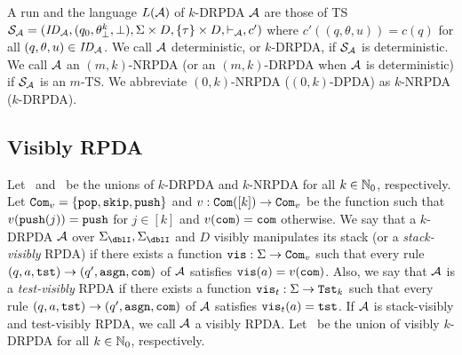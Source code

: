 A run and the language $L({\cal A})$ of $k$-DRPDA ${\cal A}$ are those of TS
${\cal S}_{\cal A}=(\mathit{ID}_{\cal A}, (q_0, \theta^k_\bot, \bot), \Sigma\times D, \{\tau\}\times D, \vdash_{\cal A}, c')$ where
$c'((q,\theta,u))=c(q)$ for all $(q,\theta,u)\in\mathit{ID}_{\cal A}$.
We call ${\cal A}$ deterministic, or $k$-DRPDA, if ${\cal S}_{\cal A}$ is deterministic.
We call ${\cal A}$ an $(m,k)$-NRPDA (or an $(m,k)$-DRPDA when ${\cal A}$ is deterministic)
if ${\cal S}_{\cal A}$ is an $m$-TS.
We abbreviate $(0,k)$-NRPDA ($(0,k)$-DPDA) as $k$-NRPDA ($k$-DRPDA).

\subsection{Visibly RPDA}
Let \DRPDA\ and \NRPDA\ be the unions of $k$-DRPDA and $k$-NRPDA for all $k\in\mathbb{N}_0$, respectively.
Let $\mathtt{Com}_v=\{\mathtt{pop},\mathtt{skip},\mathtt{push}\}$ and $v:\mathtt{Com}([k])\to\mathtt{Com}_v$ be the function such that $v(\mathtt{push}(j))=\mathtt{push}$ for $j\in[k]$ and $v(\mathtt{com})=\mathtt{com}$ otherwise.
We say that a $k$-DRPDA ${\cal A}$
over $\Sigma_\dblI,\Sigma_\dblI$ and $D$
visibly manipulates its stack (or a {\em stack-visibly} RPDA) if
there exists a function $\mathtt{vis}: \Sigma\to\mathtt{Com}_v$
such that
every rule $(q,a,\mathtt{tst})\to(q',\mathtt{asgn},\mathtt{com})$ of ${\cal A}$
satisfies $\mathtt{vis}(a)=v(\mathtt{com})$.
Also, we say that ${\cal A}$ is a {\em test-visibly} RPDA if
there exists a function $\mathtt{vis}_t: \Sigma\to\mathtt{Tst}_k$
such that
every rule $(q,a,\mathtt{tst})\to(q',\mathtt{asgn},\mathtt{com})$ of ${\cal A}$
satisfies $\mathtt{vis}_t(a)=\mathtt{tst}$.
If ${\cal A}$ is stack-visibly and test-visibly RPDA,
we call ${\cal A}$ a visibly RPDA.
Let \DRPDAv\ be the union of visibly $k$-DRPDA for all $k\in\mathbb{N}_0$, respectively.
